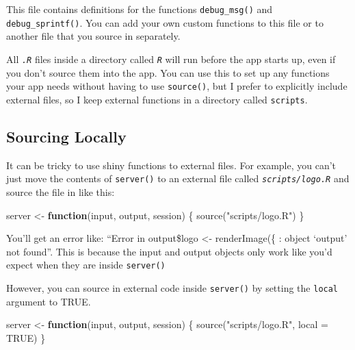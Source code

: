 \documentclass[
  oneside]{book}
\newenvironment{Shaded}{\begin{snugshade}}{\end{snugshade}}
\newcommand{\AttributeTok}[1]{\textcolor[rgb]{0.77,0.63,0.00}{#1}}
\newcommand{\ConstantTok}[1]{\textcolor[rgb]{0.00,0.00,0.00}{#1}}
\newcommand{\ControlFlowTok}[1]{\textcolor[rgb]{0.13,0.29,0.53}{\textbf{#1}}}
\newcommand{\FunctionTok}[1]{\textcolor[rgb]{0.00,0.00,0.00}{#1}}
\newcommand{\NormalTok}[1]{#1}
\newcommand{\OtherTok}[1]{\textcolor[rgb]{0.56,0.35,0.01}{#1}}
\newcommand{\StringTok}[1]{\textcolor[rgb]{0.31,0.60,0.02}{#1}}
\begin{document}
This file contains definitions for the functions \texttt{debug\_msg}\texttt{()} and \texttt{debug\_sprintf}\texttt{()}. You can add your own custom functions to this file or to another file that you source in separately.

\begin{warning}
All \textit{\texttt{.R}} files inside a directory called \textit{\texttt{R}} will run before the app starts up, even if you don't source them into the app. You can use this to set up any functions your app needs without having to use \texttt{source}\texttt{()}, but I prefer to explicitly include external files, so I keep external functions in a directory called \texttt{scripts}.

\end{warning}

\hypertarget{sourcing-locally}{%
\subsection{Sourcing Locally}\label{sourcing-locally}}

It can be tricky to use shiny functions to external files. For example, you can't just move the contents of \texttt{server}\texttt{()} to an external file called \textit{\texttt{scripts/logo.R}} and source the file in like this:

\begin{Shaded}
\begin{Highlighting}[]
\NormalTok{server }\OtherTok{\textless{}{-}} \ControlFlowTok{function}\NormalTok{(input, output, session) \{}
    \FunctionTok{source}\NormalTok{(}\StringTok{"scripts/logo.R"}\NormalTok{)}
\NormalTok{\}}
\end{Highlighting}
\end{Shaded}

You'll get an error like: ``Error in output\$logo \textless- renderImage(\{ : object `output' not found''. This is because the input and output objects only work like you'd expect when they are inside \texttt{server}\texttt{()}

However, you can source in external code inside \texttt{server}\texttt{()} by setting the \texttt{local} argument to TRUE.

\begin{Shaded}
\begin{Highlighting}[]
\NormalTok{server }\OtherTok{\textless{}{-}} \ControlFlowTok{function}\NormalTok{(input, output, session) \{}
    \FunctionTok{source}\NormalTok{(}\StringTok{"scripts/logo.R"}\NormalTok{, }\AttributeTok{local =} \ConstantTok{TRUE}\NormalTok{)}
\NormalTok{\}}
\end{Highlighting}
\end{Shaded}
\end{document}
